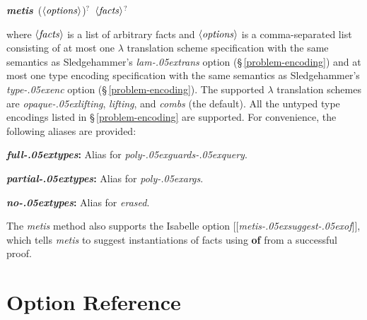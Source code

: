 \documentclass[a4paper,12pt]{article}
\let\oldS=\S
\def\S{\oldS\,}
\def\qty#1{\ensuremath{\left<\mathit{#1\/}\right>}}
\renewcommand\_{\hbox{\textunderscore\kern-.05ex}}
\begin{document}
\prew
\textbf{\textit{metis}}~(\qty{options})${}^?$~\qty{facts}${}^?$
\postw

where \qty{facts} is a list of arbitrary facts and \qty{options} is a
comma-separated list consisting of at most one $\lambda$ translation scheme
specification with the same semantics as Sledgehammer's \textit{lam\_trans}
option (\S\ref{problem-encoding}) and at most one type encoding specification
with the same semantics as Sledgehammer's \textit{type\_enc} option
(\S\ref{problem-encoding}).
%
The supported $\lambda$ translation schemes are \textit{opaque\_lifting},
\textit{lifting}, and \textit{combs} (the default).
%
All the untyped type encodings listed in \S\ref{problem-encoding} are supported.
For convenience, the following aliases are provided:
\begin{enum}
\item[\labelitemi] \textbf{\textit{full\_types}:} Alias for \textit{poly\_guards\_query}.
\item[\labelitemi] \textbf{\textit{partial\_types}:} Alias for \textit{poly\_args}.
\item[\labelitemi] \textbf{\textit{no\_types}:} Alias for \textit{erased}.
\end{enum}

The \textit{metis} method also supports the Isabelle option
[[\textit{metis\_suggest\_of}]], which tells \textit{metis} to suggest
instantiations of facts using \textbf{of} from a successful proof.

\section{Option Reference}
\label{option-reference}

\def\defl{\{}
\def\defr{\}}
\end{document}
